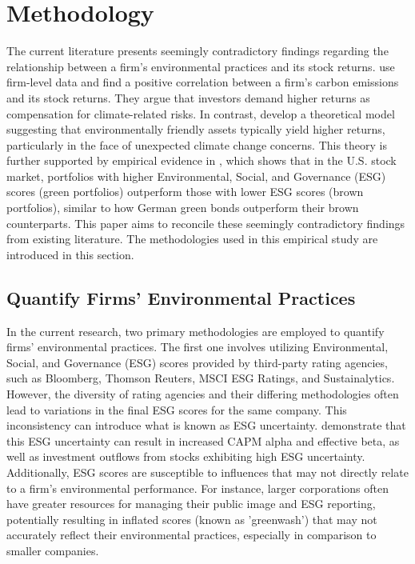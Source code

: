 \documentclass[12pt]{article}
\begin{document}
\clearpage
%
\section{Methodology} \label{sec:Methodology}
%
The current literature presents seemingly contradictory findings regarding the relationship between a firm's environmental practices and its stock returns. \citet{bolton2021investors} use firm-level data and find a positive correlation between a firm's carbon emissions and its stock returns. They argue that investors demand higher returns as compensation for climate-related risks. In contrast, \cite{pastor2021sustainable} develop a theoretical model suggesting that environmentally friendly assets typically yield higher returns, particularly in the face of unexpected climate change concerns. This theory is further supported by empirical evidence in \cite{pastor2022dissecting}, which shows that in the U.S. stock market, portfolios with higher Environmental, Social, and Governance (ESG) scores (green portfolios) outperform those with lower ESG scores (brown portfolios), similar to how German green bonds outperform their brown counterparts. This paper aims to reconcile these seemingly contradictory findings from existing literature. The methodologies used in this empirical study are introduced in this section.

\subsection{Quantify Firms' Environmental Practices}

In the current research, two primary methodologies are employed to quantify firms' environmental practices. The first one involves utilizing Environmental, Social, and Governance (ESG) scores provided by third-party rating agencies, such as Bloomberg, Thomson Reuters, MSCI ESG Ratings, and Sustainalytics. However, the diversity of rating agencies and their differing methodologies often lead to variations in the final ESG scores for the same company. This inconsistency can introduce what is known as ESG uncertainty. \cite{avramov2022sustainable} demonstrate that this ESG uncertainty can result in increased CAPM alpha and effective beta, as well as investment outflows from stocks exhibiting high ESG uncertainty. Additionally, ESG scores are susceptible to influences that may not directly relate to a firm's environmental performance. For instance, larger corporations often have greater resources for managing their public image and ESG reporting, potentially resulting in inflated scores (known as 'greenwash') that may not accurately reflect their environmental practices, especially in comparison to smaller companies.
\end{document}
